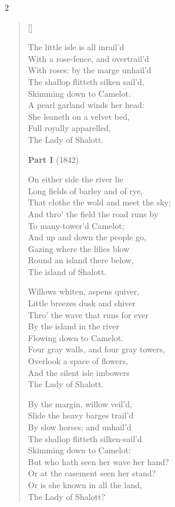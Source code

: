 \begin{paracol}{2}
\begin{verse}[\versewidth]
\begin{patverse}
The little isle is all inrail'd\\
With a rose-fence, and overtrail'd\\
With roses: by the marge unhail'd\\
The shallop flitteth silken sail'd,\\
Skimming down to Camelot.\\
A pearl garland winds her head:\\
She leaneth on a velvet bed,\\
Full royally apparelled,\\
The Lady of Shalott.\end{patverse}  \switchcolumn

\textbf{Part I} (1842)\\
\begin{patverse}
On either side the river lie\\
Long fields of barley and of rye,\\
That clothe the wold and meet the sky;\\
And thro' the field the road runs by\\
To many-tower'd Camelot;\\
And up and down the people go,\\
Gazing where the lilies blow\\
Round an island there below,\\
The island of Shalott.
\end{patverse}

\begin{patverse}
Willows whiten, aspens quiver,\\
Little breezes dusk and shiver\\
Thro' the wave that runs for ever\\
By the island in the river\\
Flowing down to Camelot.\\
Four gray walls, and four gray towers,\\
Overlook a space of flowers,\\
And the silent isle imbowers\\
The Lady of Shalott.
\end{patverse}

\begin{patverse}
By the margin, willow veil'd,\\
Slide the heavy barges trail'd\\
By slow horses; and unhail'd\\
The shallop flitteth silken-sail'd\\
Skimming down to Camelot:\\
But who hath seen her wave her hand?\\
Or at the casement seen her stand?\\
Or is she known in all the land,\\
The Lady of Shalott?
\end{patverse}


\end{verse}
\end{paracol}
